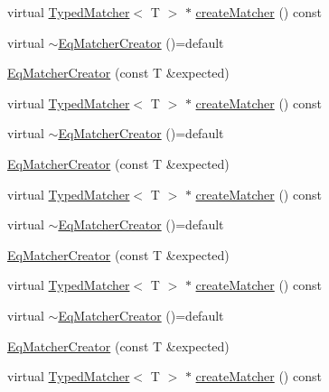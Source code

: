 \begin{DoxyCompactItemize}
virtual \mbox{\hyperlink{structfakeit_1_1TypedMatcher}{Typed\+Matcher}}$<$ T $>$ $\ast$ \mbox{\hyperlink{structfakeit_1_1internal_1_1EqMatcherCreator_a0ab880ca3aa803487b6cbb418bc2ccfc}{create\+Matcher}} () const
\item 
virtual \mbox{\hyperlink{structfakeit_1_1internal_1_1EqMatcherCreator_acfe924d6373829891b5d0f53d88486f1}{$\sim$\+Eq\+Matcher\+Creator}} ()=default
\item 
\mbox{\hyperlink{structfakeit_1_1internal_1_1EqMatcherCreator_a0d1520f92d7a9eaa115022bb46f0ae3e}{Eq\+Matcher\+Creator}} (const T \&expected)
\item 
virtual \mbox{\hyperlink{structfakeit_1_1TypedMatcher}{Typed\+Matcher}}$<$ T $>$ $\ast$ \mbox{\hyperlink{structfakeit_1_1internal_1_1EqMatcherCreator_a0ab880ca3aa803487b6cbb418bc2ccfc}{create\+Matcher}} () const
\item 
virtual \mbox{\hyperlink{structfakeit_1_1internal_1_1EqMatcherCreator_acfe924d6373829891b5d0f53d88486f1}{$\sim$\+Eq\+Matcher\+Creator}} ()=default
\item 
\mbox{\hyperlink{structfakeit_1_1internal_1_1EqMatcherCreator_a0d1520f92d7a9eaa115022bb46f0ae3e}{Eq\+Matcher\+Creator}} (const T \&expected)
\item 
virtual \mbox{\hyperlink{structfakeit_1_1TypedMatcher}{Typed\+Matcher}}$<$ T $>$ $\ast$ \mbox{\hyperlink{structfakeit_1_1internal_1_1EqMatcherCreator_a0ab880ca3aa803487b6cbb418bc2ccfc}{create\+Matcher}} () const
\item 
virtual \mbox{\hyperlink{structfakeit_1_1internal_1_1EqMatcherCreator_acfe924d6373829891b5d0f53d88486f1}{$\sim$\+Eq\+Matcher\+Creator}} ()=default
\item 
\mbox{\hyperlink{structfakeit_1_1internal_1_1EqMatcherCreator_a0d1520f92d7a9eaa115022bb46f0ae3e}{Eq\+Matcher\+Creator}} (const T \&expected)
\item 
virtual \mbox{\hyperlink{structfakeit_1_1TypedMatcher}{Typed\+Matcher}}$<$ T $>$ $\ast$ \mbox{\hyperlink{structfakeit_1_1internal_1_1EqMatcherCreator_a0ab880ca3aa803487b6cbb418bc2ccfc}{create\+Matcher}} () const
\item 
virtual \mbox{\hyperlink{structfakeit_1_1internal_1_1EqMatcherCreator_acfe924d6373829891b5d0f53d88486f1}{$\sim$\+Eq\+Matcher\+Creator}} ()=default
\item 
\mbox{\hyperlink{structfakeit_1_1internal_1_1EqMatcherCreator_a0d1520f92d7a9eaa115022bb46f0ae3e}{Eq\+Matcher\+Creator}} (const T \&expected)
\item 
virtual \mbox{\hyperlink{structfakeit_1_1TypedMatcher}{Typed\+Matcher}}$<$ T $>$ $\ast$ \mbox{\hyperlink{structfakeit_1_1internal_1_1EqMatcherCreator_a0ab880ca3aa803487b6cbb418bc2ccfc}{create\+Matcher}} () const

\end{DoxyCompactItemize}
